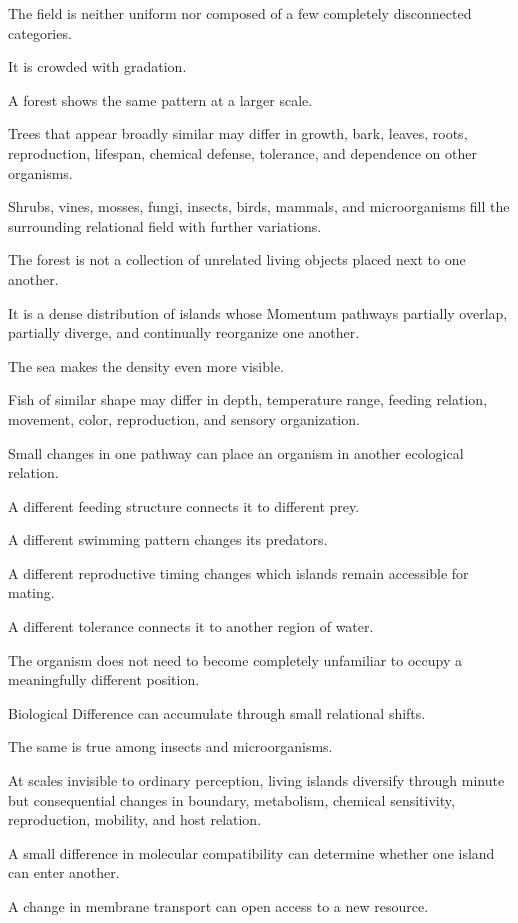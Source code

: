 The field is neither uniform nor composed of a few completely disconnected categories.

It is crowded with gradation.

A forest shows the same pattern at a larger scale.

Trees that appear broadly similar may differ in growth, bark, leaves, roots, reproduction, lifespan, chemical defense, tolerance, and dependence on other organisms.

Shrubs, vines, mosses, fungi, insects, birds, mammals, and microorganisms fill the surrounding relational field with further variations.

The forest is not a collection of unrelated living objects placed next to one another.

It is a dense distribution of islands whose Momentum pathways partially overlap, partially diverge, and continually reorganize one another.

The sea makes the density even more visible.

Fish of similar shape may differ in depth, temperature range, feeding relation, movement, color, reproduction, and sensory organization.

Small changes in one pathway can place an organism in another ecological relation.

A different feeding structure connects it to different prey.

A different swimming pattern changes its predators.

A different reproductive timing changes which islands remain accessible for mating.

A different tolerance connects it to another region of water.

The organism does not need to become completely unfamiliar to occupy a meaningfully different position.

Biological Difference can accumulate through small relational shifts.

The same is true among insects and microorganisms.

At scales invisible to ordinary perception, living islands diversify through minute but consequential changes in boundary, metabolism, chemical sensitivity, reproduction, mobility, and host relation.

A small difference in molecular compatibility can determine whether one island can enter another.

A change in membrane transport can open access to a new resource.

